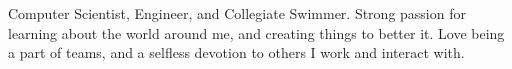 

\begin{cvparagraph}

Computer Scientist, Engineer, and Collegiate Swimmer. Strong passion for learning about the world around me, and creating things to better it. Love being a part of teams, and a selfless devotion to others I work and interact with.
\end{cvparagraph}
